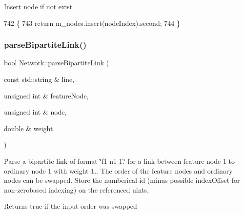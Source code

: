 Insert node if not exist 
\begin{DoxyCode}
742 \{
743     \textcolor{keywordflow}{return} m\_nodes.insert(nodeIndex).second;
744 \}
\end{DoxyCode}
\mbox{\label{classNetwork_a73f3d0596eabc17748ce76ef276317d3}} 
\subsubsection{\texorpdfstring{parse\+Bipartite\+Link()}{parseBipartiteLink()}}
{\footnotesize\ttfamily bool Network\+::parse\+Bipartite\+Link (\begin{DoxyParamCaption}\item[{const std\+::string \&}]{line,  }\item[{unsigned int \&}]{feature\+Node,  }\item[{unsigned int \&}]{node,  }\item[{double \&}]{weight }\end{DoxyParamCaption})\hspace{0.3cm}{\ttfamily [protected]}}

Parse a bipartite link of format \char`\"{}f1 n1 1.\char`\"{} for a link between feature node 1 to ordinary node 1 with weight 1.. The order of the feature nodes and ordinary nodes can be swapped. Store the numberical id (minus possible index\+Offset for non-\/zerobased indexing) on the referenced uints. \begin{DoxyReturn}{Returns}
true if the input order was swapped 
\end{DoxyReturn}

